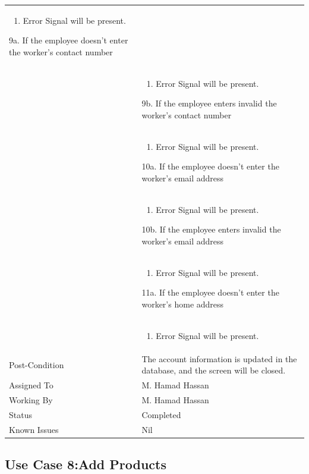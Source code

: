 \documentclass[12pt,a4paper]{article}
\begin{document}
\begin{longtable}{| p{3cm}|p{12cm}|}
\begin{enumerate}
		\item Error Signal will be present.
	\end{enumerate}
9a. If the employee doesn't enter the worker's contact number\\ 	
&	\begin{enumerate}
		\item Error Signal will be present.
	\end{enumerate}
9b. If the employee enters invalid the worker's contact number\\ 	
&	\begin{enumerate}
		\item Error Signal will be present.
	\end{enumerate}
10a. If the employee doesn't enter the worker's email address\\ 	
&	\begin{enumerate}
		\item Error Signal will be present.
	\end{enumerate}
10b. If the employee enters invalid the worker's email address\\ 	
&	\begin{enumerate}
		\item Error Signal will be present.
	\end{enumerate}
11a. If the employee doesn't enter the worker's home address\\ 	
&	\begin{enumerate}
		\item Error Signal will be present.
	\end{enumerate}
\\ \hline
Post-Condition & The account information is updated in the database, and the screen will be closed.\\\hline
Assigned To &  M. Hamad Hassan
\\ \hline
Working By &    M. Hamad Hassan
\\ \hline
Status & 	Completed	
\\ \hline
Known Issues & Nil
\\\hline
\end{longtable}
\subsection{Use Case 8:Add Products}
\end{document}
